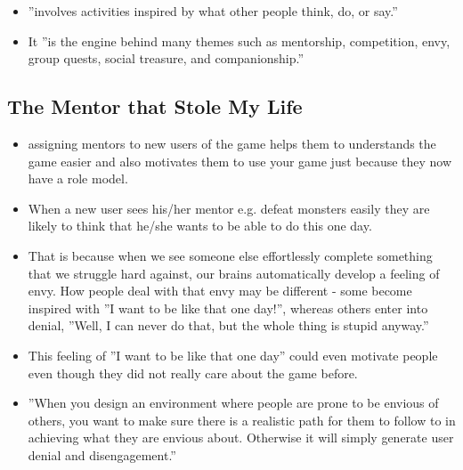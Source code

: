 \begin{itemize}
    \item ''involves activities inspired by what other people think, do, or say.''
    \item It ''is the engine behind many themes such as mentorship, competition, envy, group quests, social treasure, and companionship.''
\end{itemize}

\subsection{The Mentor that Stole My Life}
\begin{itemize}
    \item assigning mentors to new users of the game helps them to understands the game easier and also motivates them to use your game just because they now have a role model.
    \item When a new user sees his/her mentor e.g. defeat monsters easily they are likely to think that he/she wants to be able to do this one day.
    \item That is because when we see someone else effortlessly complete something that we struggle hard against, our brains automatically develop a feeling of envy. How people deal with that envy may be different - some become inspired with ''I want to be like that one day!'', whereas others enter into denial, ''Well, I can never do that, but the whole thing is stupid anyway.''
    \item This feeling of ''I want to be like that one day'' could even motivate people even though they did not really care about the game before.
    \item ''When you design an environment where people are prone to be envious of others, you want to make sure there is a realistic path for them to follow to in achieving what they are envious about. Otherwise it will simply generate user denial and disengagement.''
\end{itemize}


